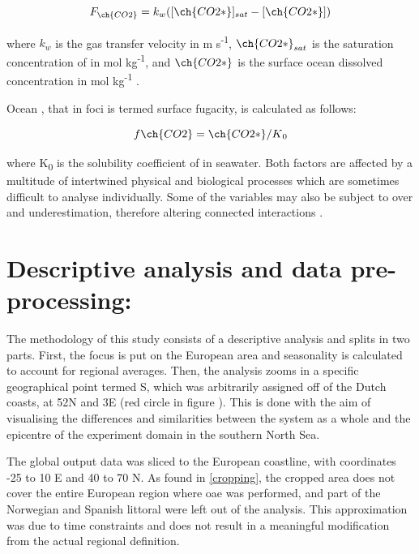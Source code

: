 \begin{center}

\begin{equation}
\label{eqn:1.1}
F_{ \ch{CO2} }  =  k_{w} ([ \ch{CO2*}]_{sat} -[ \ch{CO2*}]) 
\end{equation}

\end{center}

where $ k_{w} $ is the gas transfer velocity in m s\textsuperscript{-1}, $ \ch{CO2*}_{sat} $ is the saturation concentration of  in mol kg\textsuperscript{-1}, and $ \ch{CO2*} $ is the surface ocean dissolved  concentration in mol kg\textsuperscript{-1} \citep{chien2022foci}.

Ocean , that in \ac{foci} is termed surface  fugacity, is calculated as follows:

\begin{center}

\begin{equation}
\label{eqnfCO2}
f{ \ch{CO2} } = \ch{CO2*} / K\textsubscript{0} 
\end{equation}
    
\end{center}

where K\textsubscript{0} is the solubility coefficient of  in seawater. Both factors are affected by a multitude of intertwined physical and biological processes which are sometimes difficult to analyse individually. Some of the variables may also be subject to over and underestimation, therefore altering connected interactions \citep{chien2022foci}. 

\section{Descriptive analysis and data pre-processing:}

The methodology of this study consists of a descriptive analysis and splits in two parts. First, the focus is put on the European area and seasonality is calculated to account for regional averages. Then, the analysis zooms in a specific geographical point termed S, which was arbitrarily assigned off of the Dutch coasts, at 52\degree N and 3\degree E (red circle in figure ). This is done with the aim of visualising the differences and similarities between the system as a whole and the epicentre of the experiment domain in the southern North Sea. 

The global output data was sliced to the European coastline, with coordinates -25\degree{} to 10\degree{} E and 40\degree{} to 70\degree{} N. As found in \cref{cropping}, the cropped area does not cover the entire European region where \ac{oae} was performed, and part of the Norwegian and Spanish littoral were left out of the analysis. This approximation was due to time constraints and does not result in a meaningful modification from the actual regional definition. 

